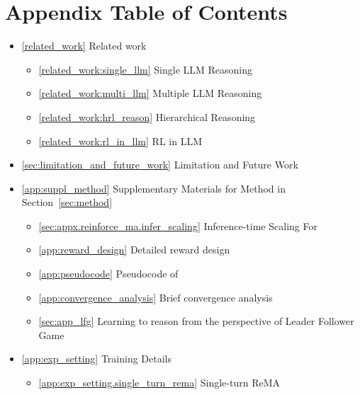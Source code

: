 \newpage
\section*{Appendix Table of Contents}

\begin{itemize}
    \item \ref{related_work} Related work \dotfill \pageref{related_work}
    \begin{itemize}
      \item \ref{related_work:single_llm} Single LLM Reasoning \dotfill \pageref{related_work:single_llm}
      \item \ref{related_work:multi_llm} Multiple LLM Reasoning \dotfill \pageref{related_work:multi_llm}
      \item \ref{related_work:hrl_reason} Hierarchical Reasoning \dotfill \pageref{related_work:hrl_reason}
      \item \ref{related_work:rl_in_llm} RL in LLM \dotfill \pageref{related_work:rl_in_llm}
    \end{itemize}
    \item \ref{sec:limitation_and_future_work} Limitation and Future Work \dotfill \pageref{sec:limitation_and_future_work}
    \item \ref{app:suppl_method} Supplementary Materials for Method in Section~\ref{sec:method} \dotfill \pageref{app:suppl_method}
    \begin{itemize}
        \item \ref{sec:appx.reinforce_ma.infer_scaling} Inference-time Scaling For \method \dotfill \pageref{sec:appx.reinforce_ma.infer_scaling}
        \item \ref{app:reward_design} Detailed reward design \dotfill \pageref{app:reward_design}
        \item \ref{app:pseudocode} Pseudocode of \method \dotfill \pageref{app:pseudocode}
        \item \ref{app:convergence_analysis} Brief convergence analysis \dotfill \pageref{app:convergence_analysis}
        \item \ref{sec:app_lfg} Learning to reason from the perspective of Leader Follower Game \dotfill \pageref{sec:app_lfg}
    \end{itemize}
    \item \ref{app:exp_setting} Training Details \dotfill \pageref{app:exp_setting}
    \begin{itemize}
        \item \ref{app:exp_setting.single_turn_rema} Single-turn ReMA \dotfill \pageref{app:exp_setting.single_turn_rema}

\end{itemize}
\end{itemize}
